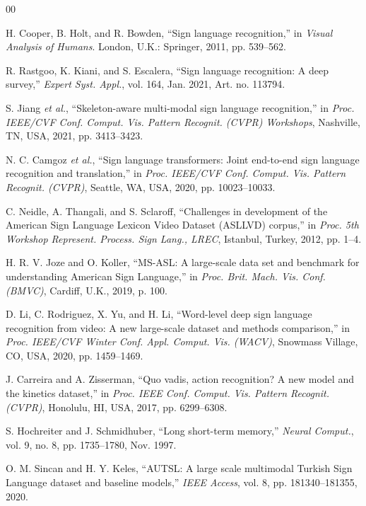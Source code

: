 \documentclass{ieeeaccess}
\begin{document}
\clearpage
\raggedbottom
\begin{thebibliography}{00}

H. Cooper, B. Holt, and R. Bowden, ``Sign language recognition,'' in \emph{Visual Analysis of Humans}. London, U.K.: Springer, 2011, pp. 539--562.

R. Rastgoo, K. Kiani, and S. Escalera, ``Sign language recognition: A deep survey,'' \emph{Expert Syst. Appl.}, vol. 164, Jan. 2021, Art. no. 113794.

S. Jiang \emph{et al.}, ``Skeleton-aware multi-modal sign language recognition,'' in \emph{Proc. IEEE/CVF Conf. Comput. Vis. Pattern Recognit. (CVPR) Workshops}, Nashville, TN, USA, 2021, pp. 3413--3423.

N. C. Camgoz \emph{et al.}, ``Sign language transformers: Joint end-to-end sign language recognition and translation,'' in \emph{Proc. IEEE/CVF Conf. Comput. Vis. Pattern Recognit. (CVPR)}, Seattle, WA, USA, 2020, pp. 10023--10033.

C. Neidle, A. Thangali, and S. Sclaroff, ``Challenges in development of the American Sign Language Lexicon Video Dataset (ASLLVD) corpus,'' in \emph{Proc. 5th Workshop Represent. Process. Sign Lang., LREC}, Istanbul, Turkey, 2012, pp. 1--4.

H. R. V. Joze and O. Koller, ``MS-ASL: A large-scale data set and benchmark for understanding American Sign Language,'' in \emph{Proc. Brit. Mach. Vis. Conf. (BMVC)}, Cardiff, U.K., 2019, p. 100.

D. Li, C. Rodriguez, X. Yu, and H. Li, ``Word-level deep sign language recognition from video: A new large-scale dataset and methods comparison,'' in \emph{Proc. IEEE/CVF Winter Conf. Appl. Comput. Vis. (WACV)}, Snowmass Village, CO, USA, 2020, pp. 1459--1469.

J. Carreira and A. Zisserman, ``Quo vadis, action recognition? A new model and the kinetics dataset,'' in \emph{Proc. IEEE Conf. Comput. Vis. Pattern Recognit. (CVPR)}, Honolulu, HI, USA, 2017, pp. 6299--6308.

S. Hochreiter and J. Schmidhuber, ``Long short-term memory,'' \emph{Neural Comput.}, vol. 9, no. 8, pp. 1735--1780, Nov. 1997.

O. M. Sincan and H. Y. Keles, ``AUTSL: A large scale multimodal Turkish Sign Language dataset and baseline models,'' \emph{IEEE Access}, vol. 8, pp. 181340--181355, 2020.


\end{thebibliography}
\end{document}
